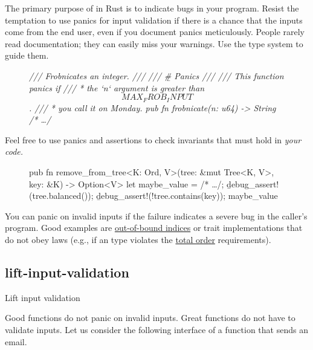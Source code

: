 \documentclass{article}
\begin{document}
The primary purpose of \href{https://doc.rust-lang.org/std/macro.panic.html}{} in Rust is to indicate bugs in your program.
Resist the temptation to use panics for input validation if there is a chance that the inputs come from the end user, even if you document panics meticulously.
People rarely read documentation; they can easily miss your warnings.
Use the type system to guide them.

\begin{figure}
\begin{code}[bad]
\em{/// Frobnicates an integer.
///
/// \b{# Panics}
///
/// This function panics if
/// * the `n` argument is greater than \[MAX_FROB_INPUT\].
/// * you call it on Monday.}
pub fn frobnicate(n: u64) -> String { /* \ldots  */ }
\end{code}
\end{figure}

Feel free to use panics and assertions to check invariants that must hold in \em{your} code.

\begin{figure}
\begin{code}[good]
pub fn remove_from_tree<K: Ord, V>(tree: &mut Tree<K, V>, key: &K) -> Option<V> {
  let maybe_value = /* \ldots  */;
  \b{debug_assert!}(tree.balanced());
  \b{debug_assert!}(!tree.contains(key));
  maybe_value
}
\end{code}
\end{figure}

You can panic on invalid inputs if the failure indicates a severe bug in the caller's program.
Good examples are \href{https://doc.rust-lang.org/1.62.0/std/ops/trait.Index.html#panics}{out-of-bound indices} or trait implementations that do not obey laws (e.g., if an \href{https://doc.rust-lang.org/1.62.0/std/cmp/trait.Ord.html}{} type violates the \href{https://en.wikipedia.org/wiki/Total_order}{total order} requirements).

\subsection{lift-input-validation}{Lift input validation}

Good functions do not panic on invalid inputs.
Great functions do not have to validate inputs.
Let us consider the following interface of a function that sends an email.
\end{document}

